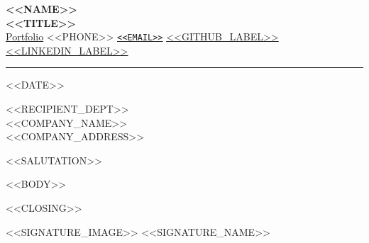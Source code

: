 \documentclass[a4paper,11pt]{letter}
\begin{document}

\begin{center}
    \textbf{\Large{<<NAME>>}} \\
    \textbf{\MakeUppercase{<<TITLE>>}} \\
    \faGlobe \hspace{2pt} \href{<<PORTFOLIO_URL>>}{Portfolio} \hspace{3pt}
    \faPhone \hspace{2pt} <<PHONE>> \hspace{3pt}
    \faEnvelope \hspace{2pt} \href{mailto:<<EMAIL>>}{\nolinkurl{<<EMAIL>>}} \hspace{3pt}
    \faGithub \hspace{2pt} \href{<<GITHUB_URL>>}{<<GITHUB_LABEL>>} \hspace{3pt}
    \faLinkedin \hspace{2pt} \href{<<LINKEDIN_URL>>}{<<LINKEDIN_LABEL>>}

    \vspace{0.3cm} \hrule
\end{center}

\vspace{0.3cm}

<<DATE>>

\vspace{0.1cm}
<<RECIPIENT_DEPT>> \\
<<COMPANY_NAME>> \\
<<COMPANY_ADDRESS>>

\vspace{0.3cm}

<<SALUTATION>>

<<BODY>>

<<CLOSING>>

<<SIGNATURE_IMAGE>>
<<SIGNATURE_NAME>>
\end{document}
